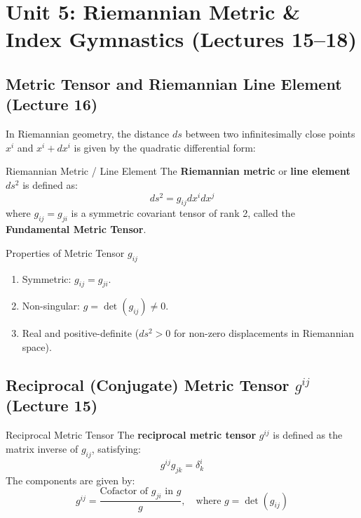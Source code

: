 \documentclass[11pt,a4paper]{article}
\begin{document}
\newpage
\section{Unit 5: Riemannian Metric \& Index Gymnastics (Lectures 15--18)}

\subsection{Metric Tensor and Riemannian Line Element (Lecture 16)}
In Riemannian geometry, the distance $ds$ between two infinitesimally close points $x^i$ and $x^i + dx^i$ is given by the quadratic differential form:

\begin{definitionbox}{Riemannian Metric / Line Element}
The \textbf{Riemannian metric} or \textbf{line element} $ds^2$ is defined as:
\[
ds^2 = g_{ij} dx^i dx^j
\]
where $g_{ij} = g_{ji}$ is a symmetric covariant tensor of rank 2, called the \textbf{Fundamental Metric Tensor}.
\end{definitionbox}

\begin{importantbox}{Properties of Metric Tensor $g_{ij}$}
\begin{enumerate}
    \item Symmetric: $g_{ij} = g_{ji}$.
    \item Non-singular: $g = \det(g_{ij}) \neq 0$.
    \item Real and positive-definite ($ds^2 > 0$ for non-zero displacements in Riemannian space).
\end{enumerate}
\end{importantbox}

\subsection{Reciprocal (Conjugate) Metric Tensor $g^{ij}$ (Lecture 15)}
\begin{definitionbox}{Reciprocal Metric Tensor}
The \textbf{reciprocal metric tensor} $g^{ij}$ is defined as the matrix inverse of $g_{ij}$, satisfying:
\[
g^{ij} g_{jk} = \delta^i_k
\]
The components are given by:
\[
g^{ij} = \frac{\text{Cofactor of } g_{ji} \text{ in } g}{g}, \quad \text{where } g = \det(g_{ij})
\]
\end{definitionbox}
\end{document}
